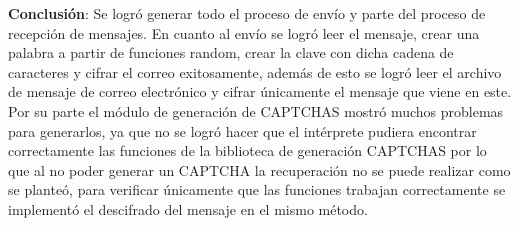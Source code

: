 \documentclass[12pt,oneside,onecolumn,openany]{report}
\begin{document}
\textbf{Conclusión}:
Se logró generar todo el proceso de envío y parte del proceso de recepción de mensajes. En cuanto al envío se logró leer el mensaje, crear una palabra a partir de funciones random, crear la clave con dicha cadena de caracteres y cifrar el correo exitosamente, además de esto se logró leer el archivo de mensaje de correo electrónico y cifrar únicamente el mensaje que viene en este.\\
Por su parte el módulo de generación de CAPTCHAS mostró muchos problemas para generarlos, ya que no se logró hacer que el intérprete pudiera encontrar correctamente las funciones de la biblioteca de generación CAPTCHAS por lo que al no poder generar un CAPTCHA la recuperación no se puede realizar como se planteó, para verificar únicamente que las funciones trabajan correctamente se implementó el descifrado del mensaje en el mismo método.\\
\end{document}
